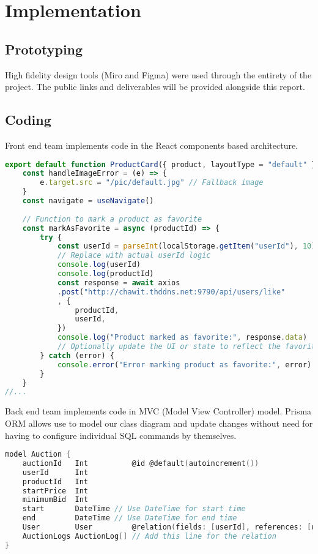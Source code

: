 %
%
\chapter{Implementation}

\section{Prototyping}

High fidelity design tools (Miro and Figma) were used through the entirety of the project. The public links and deliverables will be provided alongside this report.

\section{Coding}

Front end team implements code in the React components based architecture.

\begin{lstlisting}[language=JavaScript, caption={Example of React component}]
export default function ProductCard({ product, layoutType = "default" }) {
	const handleImageError = (e) => {
		e.target.src = "/pic/default.jpg" // Fallback image
	}
	const navigate = useNavigate()
	
	// Function to mark a product as favorite
	const markAsFavorite = async (productId) => {
		try {
			const userId = parseInt(localStorage.getItem("userId"), 10) 
			// Replace with actual userId logic
			console.log(userId)
			console.log(productId)
			const response = await axios
			.post("http://chawit.thddns.net:9790/api/users/like"
			, {
				productId,
				userId,
			})
			console.log("Product marked as favorite:", response.data)
			// Optionally update the UI or state to reflect the favorite status
		} catch (error) {
			console.error("Error marking product as favorite:", error)
		}
	}
//...
\end{lstlisting}


Back end team implements code in MVC (Model View Controller) model. Prisma ORM allows use to model our class diagram and update changes without need for having to configure individual SQL commands by themselves.

\begin{lstlisting}[language=Go, caption={Model Example}]
model Auction {
	auctionId   Int          @id @default(autoincrement())
	userId      Int
	productId   Int
	startPrice  Int
	minimumBid  Int
	start       DateTime // Use DateTime for start time
	end         DateTime // Use DateTime for end time
	User        User         @relation(fields: [userId], references: [userId])
	AuctionLogs AuctionLog[] // Add this line for the relation
}
\end{lstlisting}

